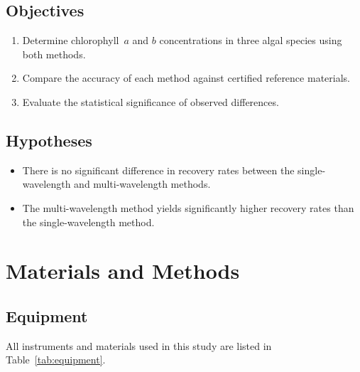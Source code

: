 \documentclass[
    language=english,
    doctype=article,
    institution=none,
    titlestyle=book,
]{../../omnilatex}
\begin{document}
\subsection{Objectives}
\begin{enumerate}
    \item Determine chlorophyll~$a$ and $b$ concentrations in three algal
          species using both methods.
    \item Compare the accuracy of each method against certified reference
          materials.
    \item Evaluate the statistical significance of observed differences.
\end{enumerate}

\subsection{Hypotheses}
\begin{itemize}
    \item[$H_{0}$:] There is no significant difference in recovery rates
          between the single-wavelength and multi-wavelength methods.
    \item[$H_{1}$:] The multi-wavelength method yields significantly higher
          recovery rates than the single-wavelength method.
\end{itemize}

\section{Materials and Methods}

\subsection{Equipment}
All instruments and materials used in this study are listed
in Table~\ref{tab:equipment}.
\end{document}
